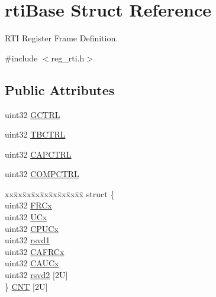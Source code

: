 \hypertarget{structrtiBase}{}\section{rti\+Base Struct Reference}
\label{structrtiBase}


R\+TI Register Frame Definition.  




{\ttfamily \#include $<$reg\+\_\+rti.\+h$>$}

\subsection*{Public Attributes}
\begin{DoxyCompactItemize}
\item 
uint32 \mbox{\hyperlink{structrtiBase_a2f8c9631c12d3bd75b1ac897843fd79d}{G\+C\+T\+RL}}
\item 
uint32 \mbox{\hyperlink{structrtiBase_a7a125b3f6937e55a69af4b73e417d30b}{T\+B\+C\+T\+RL}}
\item 
uint32 \mbox{\hyperlink{structrtiBase_ae185e690f20a1de8b10f56d9cdbb1eaf}{C\+A\+P\+C\+T\+RL}}
\item 
uint32 \mbox{\hyperlink{structrtiBase_a855df13fa648066597a35bcc76c98033}{C\+O\+M\+P\+C\+T\+RL}}
\item 
\begin{tabbing}
xx\=xx\=xx\=xx\=xx\=xx\=xx\=xx\=xx\=\kill
struct \{\\
\>uint32 \mbox{\hyperlink{structrtiBase_a79cdb93c17361c9e796c417ae21e260b}{FRCx}}\\
\>uint32 \mbox{\hyperlink{structrtiBase_adf5b74098e372deddc64f9ffdf106512}{UCx}}\\
\>uint32 \mbox{\hyperlink{structrtiBase_aba086ca9db9f36df6db78fecc4fc6d13}{CPUCx}}\\
\>uint32 \mbox{\hyperlink{structrtiBase_ab2b29a6ee442a2e9783f2de0e7335a9a}{rsvd1}}\\
\>uint32 \mbox{\hyperlink{structrtiBase_a36350363007fe2fd3acce45cab3badb4}{CAFRCx}}\\
\>uint32 \mbox{\hyperlink{structrtiBase_a2943137a2b7d0f6159c3aaced7ebb350}{CAUCx}}\\
\>uint32 \mbox{\hyperlink{structrtiBase_ade068bf96a04ddbe34663fe18d1692e9}{rsvd2}} \mbox{[}2U\mbox{]}\\
\} \mbox{\hyperlink{structrtiBase_a468f6c27fd638a205eaf2b481256209a}{CNT}} \mbox{[}2U\mbox{]}\\


\end{tabbing}
\end{DoxyCompactItemize}

